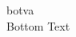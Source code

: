 
\usepackage{tabularx}
\usepackage{systeme}
\usepackage{centernot}

\enablemath


botva\\
Bottom Text

%
%
